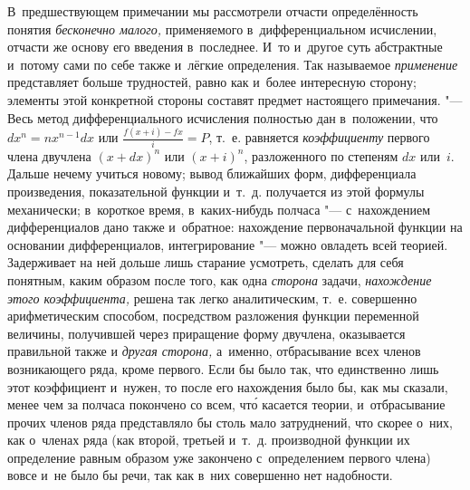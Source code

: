 В~предшествующем примечании мы рассмотрели отчасти определённость понятия
{\em бесконечно малого,} применяемого в~дифференциальном исчислении, отчасти же
основу его введения в~последнее. И~то и~другое суть абстрактные и~потому сами
по себе также и~лёгкие определения. Так называемое {\em применение}
представляет больше трудностей, равно как и~более интересную сторону; элементы
этой конкретной стороны составят предмет настоящего примечания. "--- Весь метод
дифференциального исчисления полностью дан в~положении, что $dx^n=nx^{n-1}dx$
или $\frac{f\left(x+i\right)-fx}i=P$, т.~е. равняется {\em коэффициенту}
первого члена двучлена $(x+dx)^n$ или $(x+i)^n$, разложенного по степеням $dx$ или~$i$. Дальше нечему учиться
новому; вывод ближайших форм, дифференциала произведения, показательной функции
и~т.~д. получается из этой формулы механически; в~короткое время,
в~каких-нибудь полчаса "--- с~нахождением дифференциалов дано также и~обратное:
нахождение первоначальной функции на основании дифференциалов, интегрирование
"--- можно овладеть всей теорией. Задерживает на ней дольше лишь старание
усмотреть, сделать для себя понятным, каким образом после того, как одна
{\em сторона} задачи, {\em нахождение этого коэффициента,} решена так легко
аналитическим, т.~е. совершенно арифметическим способом, посредством разложения
функции переменной величины, получившей через приращение форму двучлена,
оказывается правильной также и {\em другая сторона,} а~именно, отбрасывание
всех членов возникающего ряда, кроме первого. Если бы было так, что
единственно лишь этот коэффициент и~нужен, то после его нахождения было бы,
как мы сказали, менее чем за полчаса покончено со всем, чт\'{о} касается теории,
и~отбрасывание прочих членов ряда представляло бы столь мало затруднений, что
скорее о~них, как о~членах ряда (как второй, третьей и~т.~д.
производной функции их определение равным образом уже закончено с~определением
первого члена) вовсе и~не было бы речи, так как в~них совершенно нет надобности.

